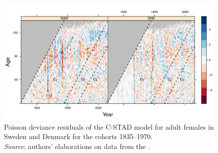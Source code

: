 \documentclass[11pt, a4paper]{article}
\begin{document}
\begin{landscape}
	\begin{figure}[h!]
		\begin{center}
			\includegraphics[scale=0.92]{./Figures/FA2.pdf} 
			\caption{Poisson deviance residuals of the C-STAD model for adult females in Sweden and Denmark for the cohorts 1835--1970.\\ \small \textit{Source}: authors' elaborations on data from the \cite{HMD}.\label{Fig:CSTADresid}}    
		\end{center}
	\end{figure}
\end{landscape}


 
\end{document}
